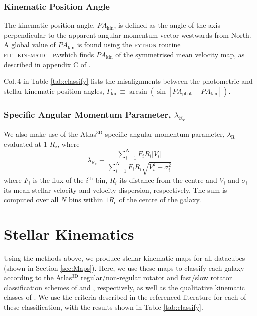 \documentclass[a4paper,fleqn,usenatbib]{mnras}
\begin{document}
		\subsubsection{Kinematic Position Angle}
			\label{subsubsec:KinPA}
			The kinematic position angle, $PA_\text{kin}$, is defined as the angle of the axis perpendicular to the apparent angular momentum vector westwards from North. A global value of $PA_\text{kin}$ is found using the \textsc{python} routine \textsc{fit\_kinematic\_pa}\footnotemark[\ref{fn:Cappellari}] which finds $PA_\text{kin}$ of the symmetrised mean velocity map, as described in appendix C of \citet{Krajnovic2006}. %

			Col.\,4 in Table \ref{tab:classify} lists the misalignments between the photometric and stellar kinematic position angles, $\Gamma_\text{kin} \equiv \arcsin(\sin[PA_\text{phot} - PA_\text{kin}])$.

		\subsubsection{Specific Angular Momentum Parameter, $\lambda_\mathrm{R_e}$}
			We also make use of the Atlas$^\text{3D}$ specific angular momentum parameter, $\lambda_\text{R}$ \citep{Emsellem2007} evaluated at 1 $R_\text{e}$, where 
			\begin{equation}
				\lambda_\mathrm{R_e} \equiv \frac{\sum_{i=1}^{N} F_i R_i |V_i|}{\sum_{i=1}^{N} F_i R_i \sqrt{V_i^2 + \sigma_i^2}}
			\end{equation}
			where $F_i$ is the flux of the $i^\text{th}$ bin, $R_i$ its distance from the centre and $V_i$ and $\sigma_i$ its mean stellar velocity and velocity dispersion, respectively. The sum is computed over all $N$ bins within $1R_\text{e}$ of the centre of the galaxy.

\section{Stellar Kinematics}
	\label{sec:StarKine}
	Using the methods above, we produce stellar kinematic maps for all datacubes (shown in Section \ref{sec:Maps}). Here, we use these maps to classify each galaxy according to the Atlas$^\text{3D}$ regular/non-regular rotator and fast/slow rotator classification schemes of \citet{Krajnovic2006} and \citet{Cappellari2016}, respectively, as well as the qualitative kinematic classes of \citet{Krajnovic2011}. We use the criteria described in the referenced literature for each of these classification, with the results shown in Table \ref{tab:classify}.
\end{document}
